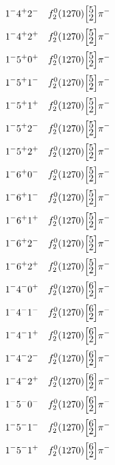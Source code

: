 \documentclass[10pt,a4paper]{article}
\def\dst{\displaystyle}
\def\vsp{\hbox{\vrule height12.5pt depth3.5pt width0pt}}
\def\ells#1#2{\Big[\hskip-5pt\vsp\begin{array}{c}\dst#1\\[-4pt]\dst#2\end{array}\vsp\hskip-5pt\Big]}
\begin{document}
\begin{align*} 
 \begin{aligned}
1^{-}4^{+}2^{-}\quad & f_2^0(1270)\ells{5}{2}\pi^-\\
1^{-}4^{+}2^{+}\quad & f_2^0(1270)\ells{5}{2}\pi^-\\
1^{-}5^{+}0^{+}\quad & f_2^0(1270)\ells{5}{2}\pi^-\\
1^{-}5^{+}1^{-}\quad & f_2^0(1270)\ells{5}{2}\pi^-\\
1^{-}5^{+}1^{+}\quad & f_2^0(1270)\ells{5}{2}\pi^-\\
1^{-}5^{+}2^{-}\quad & f_2^0(1270)\ells{5}{2}\pi^-\\
1^{-}5^{+}2^{+}\quad & f_2^0(1270)\ells{5}{2}\pi^-\\
1^{-}6^{+}0^{-}\quad & f_2^0(1270)\ells{5}{2}\pi^-\\
1^{-}6^{+}1^{-}\quad & f_2^0(1270)\ells{5}{2}\pi^-\\
1^{-}6^{+}1^{+}\quad & f_2^0(1270)\ells{5}{2}\pi^-\\
1^{-}6^{+}2^{-}\quad & f_2^0(1270)\ells{5}{2}\pi^-\\
1^{-}6^{+}2^{+}\quad & f_2^0(1270)\ells{5}{2}\pi^-\\
1^{-}4^{-}0^{+}\quad & f_2^0(1270)\ells{6}{2}\pi^-\\
1^{-}4^{-}1^{-}\quad & f_2^0(1270)\ells{6}{2}\pi^-\\
1^{-}4^{-}1^{+}\quad & f_2^0(1270)\ells{6}{2}\pi^-\\
1^{-}4^{-}2^{-}\quad & f_2^0(1270)\ells{6}{2}\pi^-\\
1^{-}4^{-}2^{+}\quad & f_2^0(1270)\ells{6}{2}\pi^-\\
1^{-}5^{-}0^{-}\quad & f_2^0(1270)\ells{6}{2}\pi^-\\
1^{-}5^{-}1^{-}\quad & f_2^0(1270)\ells{6}{2}\pi^-\\
1^{-}5^{-}1^{+}\quad & f_2^0(1270)\ells{6}{2}\pi^-\\
\end{aligned} 
 \end{align*}\pagebreak
\end{document}
